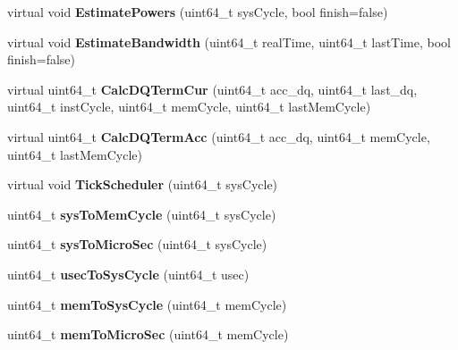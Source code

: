 \begin{DoxyCompactItemize}
\item 
\hypertarget{classMemControllerBase_ae4c6934d683ffe4343e72d64c4a2f363}{virtual void {\bfseries Estimate\-Powers} (uint64\-\_\-t sys\-Cycle, bool finish=false)}\label{classMemControllerBase_ae4c6934d683ffe4343e72d64c4a2f363}

\item 
\hypertarget{classMemControllerBase_a3b00b196d56dc9a4f31ceca5b1682cb4}{virtual void {\bfseries Estimate\-Bandwidth} (uint64\-\_\-t real\-Time, uint64\-\_\-t last\-Time, bool finish=false)}\label{classMemControllerBase_a3b00b196d56dc9a4f31ceca5b1682cb4}

\item 
\hypertarget{classMemControllerBase_adc9cd22104c7d1375d47976901209e26}{virtual uint64\-\_\-t {\bfseries Calc\-D\-Q\-Term\-Cur} (uint64\-\_\-t acc\-\_\-dq, uint64\-\_\-t last\-\_\-dq, uint64\-\_\-t inst\-Cycle, uint64\-\_\-t mem\-Cycle, uint64\-\_\-t last\-Mem\-Cycle)}\label{classMemControllerBase_adc9cd22104c7d1375d47976901209e26}

\item 
\hypertarget{classMemControllerBase_a1afab020d6f5ea519c49bdb3ded8502c}{virtual uint64\-\_\-t {\bfseries Calc\-D\-Q\-Term\-Acc} (uint64\-\_\-t acc\-\_\-dq, uint64\-\_\-t mem\-Cycle, uint64\-\_\-t last\-Mem\-Cycle)}\label{classMemControllerBase_a1afab020d6f5ea519c49bdb3ded8502c}

\item 
\hypertarget{classMemControllerBase_a57d52cde57bac4bf76fb67d65bf04ea2}{virtual void {\bfseries Tick\-Scheduler} (uint64\-\_\-t sys\-Cycle)}\label{classMemControllerBase_a57d52cde57bac4bf76fb67d65bf04ea2}

\item 
\hypertarget{classMemControllerBase_a7177fcd259a98335c3c32b1dc86c54f6}{uint64\-\_\-t {\bfseries sys\-To\-Mem\-Cycle} (uint64\-\_\-t sys\-Cycle)}\label{classMemControllerBase_a7177fcd259a98335c3c32b1dc86c54f6}

\item 
\hypertarget{classMemControllerBase_aa09dc5a73cb7437ff5aac88515e469e6}{uint64\-\_\-t {\bfseries sys\-To\-Micro\-Sec} (uint64\-\_\-t sys\-Cycle)}\label{classMemControllerBase_aa09dc5a73cb7437ff5aac88515e469e6}

\item 
\hypertarget{classMemControllerBase_aaf2fdcacf48b08800ffd1aabd8ac36b9}{uint64\-\_\-t {\bfseries usec\-To\-Sys\-Cycle} (uint64\-\_\-t usec)}\label{classMemControllerBase_aaf2fdcacf48b08800ffd1aabd8ac36b9}

\item 
\hypertarget{classMemControllerBase_aab7c0e55f63511b8ce54ec2d765115ad}{uint64\-\_\-t {\bfseries mem\-To\-Sys\-Cycle} (uint64\-\_\-t mem\-Cycle)}\label{classMemControllerBase_aab7c0e55f63511b8ce54ec2d765115ad}

\item 
\hypertarget{classMemControllerBase_a1516dc45607d418a6171562927486b08}{uint64\-\_\-t {\bfseries mem\-To\-Micro\-Sec} (uint64\-\_\-t mem\-Cycle)}\label{classMemControllerBase_a1516dc45607d418a6171562927486b08}

\end{DoxyCompactItemize}

